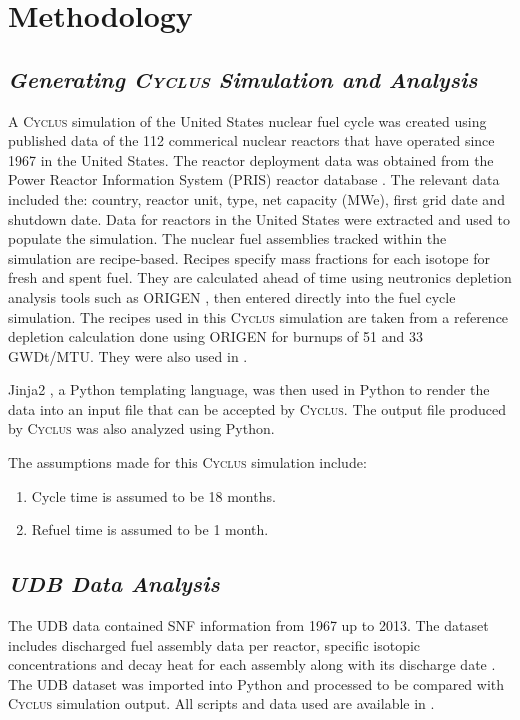 \documentclass{anstrans}
\newcommand{\Cyclus}{\textsc{Cyclus}\xspace}%
\begin{document}
\section{Methodology}
\subsection{\textit{Generating \Cyclus Simulation and Analysis}}
A \Cyclus simulation of the United States nuclear fuel cycle was created using published data of the 112 commerical nuclear reactors that have operated since 1967 in the United States. The reactor deployment data was obtained from the Power Reactor Information System (PRIS) reactor database \cite{IAEA_pris_2017}. The relevant data included the: country, reactor unit, type, net capacity (MWe), first grid date and shutdown date. Data for reactors in the United States were extracted and used to populate the simulation. The nuclear fuel assemblies tracked within the simulation are recipe-based. Recipes specify mass fractions for each isotope for fresh and spent fuel. They are calculated ahead of time using neutronics depletion analysis tools such as ORIGEN \cite{bell_origen_1973}, then entered directly into the fuel cycle simulation. The recipes used in this \Cyclus simulation are taken from a reference depletion calculation done using ORIGEN \cite{bell_origen_1973} for burnups of 51 and 33 GWDt/MTU. They were also used in \cite{wilson_adoption_2009, bae_synergistic_2017}. 

Jinja2 \cite{ronacher_welcome_2018}, a Python templating language, was then used in Python to render the data into an input file that can be accepted by \Cyclus. The output file produced by \Cyclus was also analyzed using Python. 

The assumptions made for this \Cyclus simulation include: 

\begin{enumerate}
	\item Cycle time is assumed to be 18 months. 
	\item Refuel time is assumed to be 1 month. 
\end{enumerate}


\subsection{\textit{UDB Data Analysis}}
The UDB data contained SNF information from 1967 up to 2013. The dataset includes discharged fuel assembly data per reactor, specific isotopic concentrations and decay heat for each assembly along with its discharge date \cite{peterson_unf-st&dards_2017}. The UDB dataset was imported into Python and processed to be compared with \Cyclus simulation output. All scripts and data used are available in \cite{chee_arfc/transition-scenarios_2018}. 
\end{document}
